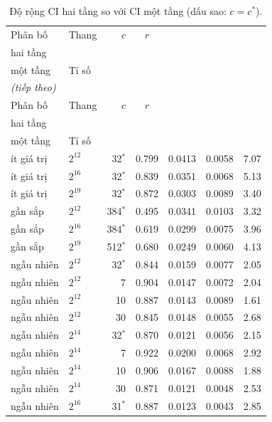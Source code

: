 \footnotesize
\begin{longtable}{llrcccc}
\caption{Độ rộng CI hai tầng so với CI một tầng (dấu sao: $c = c^*$).}\label{tab:ci_width}\\
\toprule
Phân bố & Thang & $c$ & $r$ & \makecell{{Rộng CI} \\ {hai tầng}} & \makecell{{Rộng CI} \\ {một tầng}} & Tỉ số \\
\midrule
\endfirsthead
\multicolumn{7}{l}{\textit{(tiếp theo)}}\\
\toprule
Phân bố & Thang & $c$ & $r$ & \makecell{{Rộng CI} \\ {hai tầng}} & \makecell{{Rộng CI} \\ {một tầng}} & Tỉ số \\
\midrule
\endhead
\bottomrule
\endlastfoot
ít giá trị & $2^{12}$ & 32$^*$ & 0.799 & 0.0413 & 0.0058 & 7.07 \\
ít giá trị & $2^{16}$ & 32$^*$ & 0.839 & 0.0351 & 0.0068 & 5.13 \\
ít giá trị & $2^{19}$ & 32$^*$ & 0.872 & 0.0303 & 0.0089 & 3.40 \\
gần sắp & $2^{12}$ & 384$^*$ & 0.495 & 0.0341 & 0.0103 & 3.32 \\
gần sắp & $2^{16}$ & 384$^*$ & 0.619 & 0.0299 & 0.0075 & 3.96 \\
gần sắp & $2^{19}$ & 512$^*$ & 0.680 & 0.0249 & 0.0060 & 4.13 \\
ngẫu nhiên & $2^{12}$ & 32$^*$ & 0.844 & 0.0159 & 0.0077 & 2.05 \\
ngẫu nhiên & $2^{12}$ & 7 & 0.904 & 0.0147 & 0.0072 & 2.04 \\
ngẫu nhiên & $2^{12}$ & 10 & 0.887 & 0.0143 & 0.0089 & 1.61 \\
ngẫu nhiên & $2^{12}$ & 30 & 0.845 & 0.0148 & 0.0055 & 2.68 \\
ngẫu nhiên & $2^{14}$ & 32$^*$ & 0.870 & 0.0121 & 0.0056 & 2.15 \\
ngẫu nhiên & $2^{14}$ & 7 & 0.922 & 0.0200 & 0.0068 & 2.92 \\
ngẫu nhiên & $2^{14}$ & 10 & 0.906 & 0.0167 & 0.0088 & 1.88 \\
ngẫu nhiên & $2^{14}$ & 30 & 0.871 & 0.0121 & 0.0048 & 2.53 \\
ngẫu nhiên & $2^{16}$ & 31$^*$ & 0.887 & 0.0123 & 0.0043 & 2.85 \\

\end{longtable}
